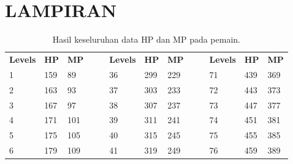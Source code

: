 \chapter*{LAMPIRAN}
\vspace{4ex}
\label{chap:chap6_attachment}

\begin{table}[!h]
	\centering
	\caption{Hasil keseluruhan data HP dan MP pada pemain.}
	\vspace{-1ex}
	\label{tb:player_hp_mp_all}
	\begin{tabular}{|l|l|l|ll|l|l|l|lllll}
		\cline{1-3} \cline{6-8} \cline{11-13}
		\multicolumn{1}{|c|}{\cellcolor[HTML]{C0C0C0}\textbf{Levels}} & \multicolumn{1}{c|}{\cellcolor[HTML]{C0C0C0}\textbf{HP}} & \multicolumn{1}{c|}{\cellcolor[HTML]{C0C0C0}\textbf{MP}} & \multicolumn{1}{c}{} & \multicolumn{1}{c|}{} & \multicolumn{1}{c|}{\cellcolor[HTML]{C0C0C0}\textbf{Levels}} & \multicolumn{1}{c|}{\cellcolor[HTML]{C0C0C0}\textbf{HP}} & \multicolumn{1}{c|}{\cellcolor[HTML]{C0C0C0}\textbf{MP}} & \multicolumn{1}{c}{} & \multicolumn{1}{c|}{} & \multicolumn{1}{c|}{\cellcolor[HTML]{C0C0C0}\textbf{Levels}} & \multicolumn{1}{c|}{\cellcolor[HTML]{C0C0C0}\textbf{HP}} & \multicolumn{1}{c|}{\cellcolor[HTML]{C0C0C0}\textbf{MP}} \\ \cline{1-3} \cline{6-8} \cline{11-13} 
		1 & 159 & 89 &  &  & 36 & 299 & 229 &  & \multicolumn{1}{l|}{} & \multicolumn{1}{l|}{71} & \multicolumn{1}{l|}{439} & \multicolumn{1}{l|}{369} \\ \cline{1-3} \cline{6-8} \cline{11-13} 
		2 & 163 & 93 &  &  & 37 & 303 & 233 &  & \multicolumn{1}{l|}{} & \multicolumn{1}{l|}{72} & \multicolumn{1}{l|}{443} & \multicolumn{1}{l|}{373} \\ \cline{1-3} \cline{6-8} \cline{11-13} 
		3 & 167 & 97 &  &  & 38 & 307 & 237 &  & \multicolumn{1}{l|}{} & \multicolumn{1}{l|}{73} & \multicolumn{1}{l|}{447} & \multicolumn{1}{l|}{377} \\ \cline{1-3} \cline{6-8} \cline{11-13} 
		4 & 171 & 101 &  &  & 39 & 311 & 241 &  & \multicolumn{1}{l|}{} & \multicolumn{1}{l|}{74} & \multicolumn{1}{l|}{451} & \multicolumn{1}{l|}{381} \\ \cline{1-3} \cline{6-8} \cline{11-13} 
		5 & 175 & 105 &  &  & 40 & 315 & 245 &  & \multicolumn{1}{l|}{} & \multicolumn{1}{l|}{75} & \multicolumn{1}{l|}{455} & \multicolumn{1}{l|}{385} \\ \cline{1-3} \cline{6-8} \cline{11-13} 
		6 & 179 & 109 &  &  & 41 & 319 & 249 &  & \multicolumn{1}{l|}{} & \multicolumn{1}{l|}{76} & \multicolumn{1}{l|}{459} & \multicolumn{1}{l|}{389} \\ \cline{1-3} \cline{6-8} \cline{11-13} 

\end{tabular}
\end{table}
